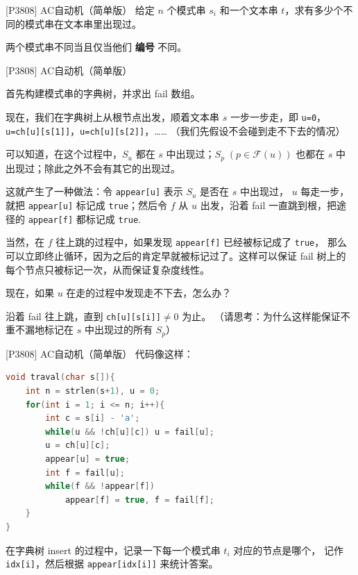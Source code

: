 \documentclass{beamer}
\begin{document}
\begin{frame}[fragile]{[P3808] AC自动机（简单版）}
    \small
    给定 $n$ 个模式串 $s_i$ 和一个文本串 $t$，求有多少个不同的模式串在文本串里出现过。  

    两个模式串不同当且仅当他们 \textbf{编号} 不同。
\end{frame}

\begin{frame}[fragile]{[P3808] AC自动机（简单版）}
    \footnotesize

    首先构建模式串的字典树，并求出 fail 数组。

    \vspace{.7em}\pause
    现在，我们在字典树上从根节点出发，顺着文本串 $s$ 一步一步走，即
    \verb|u=0|，\verb|u=ch[u][s[1]]|，\verb|u=ch[u][s[2]]|，……
    （我们先假设不会碰到走不下去的情况）

    \vspace{.7em}\pause
    可以知道，在这个过程中，$S_u$ 都在 $s$ 中出现过；$S_p\;(p\in \mathcal{F}(u))$
    也都在 $s$ 中出现过；除此之外不会有其它的出现过。

    \vspace{.7em}\pause
    这就产生了一种做法：令 \verb|appear[u]| 表示 $S_u$ 是否在 $s$ 中出现过，
    $u$ 每走一步，就把 \verb|appear[u]| 标记成 \verb|true|；然后令 $f$ 从 $u$
    出发，沿着 fail 一直跳到根，把途径的 \verb|appear[f]| 都标记成 \verb|true|.

    \vspace{.7em}\pause
    当然，在 $f$ 往上跳的过程中，如果发现 \verb|appear[f]| 已经被标记成了 \verb|true|，
    那么可以立即终止循环，因为之后的肯定早就被标记过了。这样可以保证
    fail 树上的每个节点只被标记一次，从而保证复杂度线性。

    \vspace{.7em}\pause
    现在，如果 $u$ 在走的过程中发现走不下去，怎么办？

    \vspace{.7em}\pause
    沿着 fail 往上跳，直到 \verb|ch[u][s[i]]|$\neq 0$ 为止。
    （请思考：为什么这样能保证不重不漏地标记在 $s$ 中出现过的所有 $S_p$）
\end{frame}

\begin{frame}[fragile]{[P3808] AC自动机（简单版）}
    \small
    代码像这样：

    \begin{lstlisting}[language=c++]
void traval(char s[]){
    int n = strlen(s+1), u = 0;
    for(int i = 1; i <= n; i++){
        int c = s[i] - 'a';
        while(u && !ch[u][c]) u = fail[u];
        u = ch[u][c];
        appear[u] = true;
        int f = fail[u];
        while(f && !appear[f])
            appear[f] = true, f = fail[f];
    }
}
    \end{lstlisting}

    \vspace{1em}\pause
    在字典树 insert 的过程中，记录一下每一个模式串 $t_i$ 对应的节点是哪个，
    记作 \verb|idx[i]|，然后根据 \verb|appear[idx[i]]| 来统计答案。
\end{frame}
\end{document}
